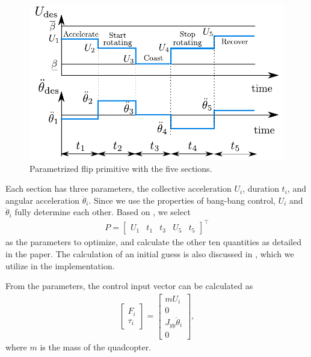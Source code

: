 \begin{figure}
\centering
\includegraphics[scale=.7]{Fig/sections2.pdf}
\caption{Parametrized flip primitive with the five sections.}\label{fig:sections}
\end{figure}

Each section has three parameters, the collective acceleration $U_i$, duration $t_i$, and angular acceleration $\ddot{\theta}_i$. Since we use the properties of bang-bang control, $U_i$ and $\ddot{\theta}_i$ fully determine each other. Based on \cite{LSICRA2010}, we select 
\begin{align}
P=\begin{bmatrix}\label{eq:openparams}
U_1 & t_1 & t_3 & U_5& t_5
\end{bmatrix} ^\top
\end{align} as the parameters to optimize, and calculate the other ten quantities as detailed in the paper. The calculation of an initial guess is also discussed in \cite{LSICRA2010}, which we utilize in the implementation.

From the parameters, the control input vector can be calculated as
 \begin{align}\label{eq:openinp}
    \begin{bmatrix}
        F_i \\ \tau_i
    \end{bmatrix}=\begin{bmatrix}
        mU_i \\ 0 \\ J_{yy}\ddot{\theta}_i \\ 0
    \end{bmatrix},
\end{align}   
where $m$ is the mass of the quadcopter.

